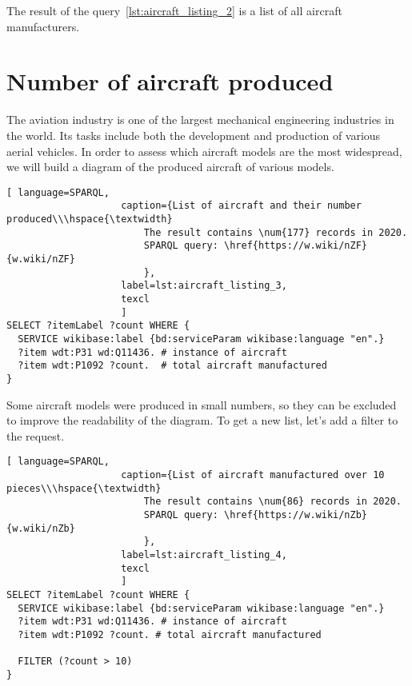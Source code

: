 The result of the query~\ref{lst:aircraft_listing_2} is a list of all aircraft manufacturers.


\section{Number of aircraft produced}

The aviation industry is one of the largest mechanical engineering industries in the world. Its tasks include both the development 
and production of various aerial vehicles. In order to assess which aircraft models are the most widespread, we will build a diagram 
of the produced aircraft of various models.

\begin{lstlisting}[ language=SPARQL, 
                    caption={List of aircraft and their number produced\\\hspace{\textwidth}
                        The result contains \num{177} records in 2020. 
                        SPARQL query: \href{https://w.wiki/nZF}{w.wiki/nZF}
                        },
                    label=lst:aircraft_listing_3,
                    texcl 
                    ]
SELECT ?itemLabel ?count WHERE {
  SERVICE wikibase:label {bd:serviceParam wikibase:language "en".}
  ?item wdt:P31 wd:Q11436. # instance of aircraft
  ?item wdt:P1092 ?count.  # total aircraft manufactured
}
\end{lstlisting}

Some aircraft models were produced in small numbers, so they can be excluded to improve the readability of the diagram. 
To get a new list, let's add a filter to the request.

\begin{lstlisting}[ language=SPARQL, 
                    caption={List of aircraft manufactured over 10 pieces\\\hspace{\textwidth}
                        The result contains \num{86} records in 2020.
                        SPARQL query: \href{https://w.wiki/nZb}{w.wiki/nZb}
                        },
                    label=lst:aircraft_listing_4,
                    texcl 
                    ]
SELECT ?itemLabel ?count WHERE {
  SERVICE wikibase:label {bd:serviceParam wikibase:language "en".}
  ?item wdt:P31 wd:Q11436. # instance of aircraft
  ?item wdt:P1092 ?count. # total aircraft manufactured
  
  FILTER (?count > 10)
}
\end{lstlisting}

